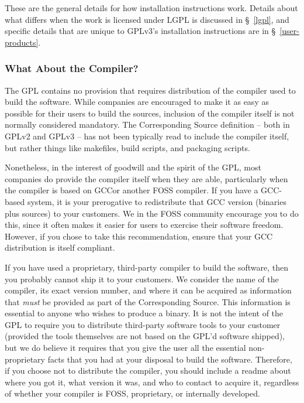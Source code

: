 \documentclass[letterpaper]{fixme}
\begin{document}
These are the general details for how installation instructions work.
Details about what differs when the work is licensed under LGPL is
discussed in \S~\ref{lgpl}, and specific details that are unique to
GPLv3's installation instructions are in \S~\ref{user-products}.

\subsubsection{What About the Compiler?}

The GPL contains no provision that requires distribution of the compiler
used to build the software.  While companies are encouraged to make it as
easy as possible for their users to build the sources, inclusion of the
compiler itself is not normally considered mandatory.  The Corresponding
Source definition -- both in GPLv2 and GPLv3 -- has not been typically
read to include the compiler itself, but rather things like makefiles,
build scripts, and packaging scripts.

Nonetheless, in the interest of goodwill and the spirit of the GPL, most
companies do provide the compiler itself when they are able, particularly
when the compiler is based on GCC\@ or another FOSS compiler.  If you have
a GCC-based system, it is your prerogative to redistribute that GCC
version (binaries plus sources) to your customers.  We in the FOSS
community encourage you to do this, since it often makes it easier for
users to exercise their software freedom.  However, if you chose to take
this recommendation, ensure that your GCC distribution is itself
compliant.

If you have used a proprietary, third-party compiler to build the
software, then you probably cannot ship it to your customers.  We consider
the name of the compiler, its exact version number, and where it can be
acquired as information that \emph{must} be provided as part of the
Corresponding Source.  This information is essential to anyone who wishes
to produce a binary.  It is not the intent of the GPL to require you to
distribute third-party software tools to your customer (provided the tools
themselves are not based on the GPL'd software shipped), but we do believe
it requires that you give the user all the essential non-proprietary facts
that you had at your disposal to build the software.  Therefore, if you
choose not to distribute the compiler, you should include a {\sc readme}
about where you got it, what version it was, and who to contact to acquire
it, regardless of whether your compiler is FOSS, proprietary, or
internally developed.
\end{document}
